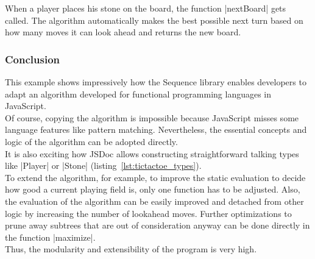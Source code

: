 When a player places his stone on the board, the function |nextBoard| gets
called. The algorithm automatically makes the best possible next turn based on
how many moves it can look ahead and returns the new board.

\subsubsection{Conclusion} %
\label{subsub:ttt_conclusion}
This example shows impressively how the Sequence library enables developers to
adapt an algorithm developed for functional programming languages in
JavaScript.\\
Of course, copying the algorithm is impossible because JavaScript misses some
language features like pattern matching. Nevertheless, the essential concepts
and logic of the algorithm can be adopted directly. \\
It is also exciting how JSDoc allows constructing straightforward talking types
like |Player| or |Stone| (listing~\ref{lst:tictactoe_types}).\\
To extend the algorithm, for example, to improve the static evaluation to
decide how good a current playing field is, only one function has to be
adjusted. Also, the evaluation of the algorithm can be easily improved and
detached from other logic by increasing the number of lookahead moves. Further
optimizations to prune away subtrees that are out of consideration anyway can
be done directly in the function |maximize|.\\
Thus, the modularity and extensibility of the program is very high.
